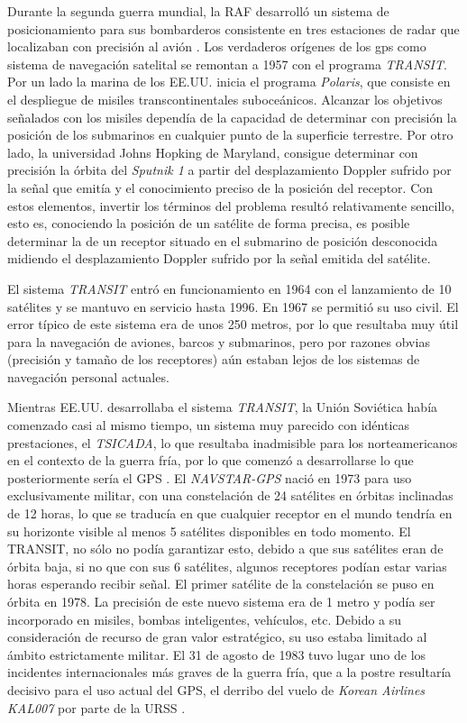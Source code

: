 Durante la segunda guerra mundial, la \ac{RAF} desarrolló un sistema de
posicionamiento para sus bombarderos consistente en tres estaciones de radar que localizaban
con precisión al avión \cite{Ori13}. 
Los verdaderos orígenes de los gps como sistema de navegación satelital se remontan a 1957 con
el programa \textit{TRANSIT}. Por un lado la marina de los \ac{EE.UU.} inicia el programa \textit{Polaris},
que consiste en el despliegue de misiles transcontinentales suboceánicos. Alcanzar los objetivos señalados
con los misiles dependía de la capacidad de determinar con precisión la posición de los
submarinos en cualquier punto de la superficie terrestre. Por otro lado, la universidad Johns
Hopking de Maryland, consigue determinar con precisión la órbita del \textit{Sputnik 1} a partir del
desplazamiento Doppler sufrido por la señal que emitía y el conocimiento preciso de la posición
del receptor. Con estos elementos, invertir los términos del problema resultó relativamente
sencillo, esto es, conociendo la posición de un satélite de forma precisa, es posible determinar
la de un receptor situado en el submarino de posición desconocida midiendo el desplazamiento
Doppler sufrido por la señal emitida del satélite.

El sistema \textit{TRANSIT} entró en funcionamiento en 1964 con el lanzamiento de 10 satélites y se mantuvo en servicio
hasta 1996. En 1967 se permitió su uso civil. El error típico de este sistema era de unos 250
metros, por lo que resultaba muy útil para la navegación de aviones, barcos y submarinos, pero
por razones obvias (precisión y tamaño de los receptores) aún estaban lejos de los sistemas de
navegación personal actuales.

Mientras \ac{EE.UU.} desarrollaba el sistema \textit{TRANSIT}, la Unión Soviética había comenzado casi al mismo tiempo, un sistema muy parecido con idénticas prestaciones, el \textit{TSICADA}, lo que resultaba inadmisible para los norteamericanos en el
contexto de la guerra fría, por lo que comenzó a desarrollarse lo que posteriormente sería el
\ac{GPS} \cite{Pala10}.
El \textit{NAVSTAR-GPS} nació en 1973 para uso exclusivamente militar, con una constelación de 24
satélites en órbitas inclinadas de 12 horas, lo que se traducía en que cualquier receptor en el
mundo tendría en su horizonte visible al menos 5 satélites disponibles en todo momento. El
TRANSIT, no sólo no podía garantizar esto, debido a que sus satélites eran de órbita baja, si no
que con sus 6 satélites, algunos receptores podían estar varias horas esperando recibir señal. El primer
satélite de la constelación se puso en órbita en 1978. La precisión de este nuevo sistema era de 1 metro y podía
ser incorporado en misiles, bombas inteligentes, vehículos, etc. Debido a su consideración de
recurso de gran valor estratégico, su uso estaba limitado al ámbito estrictamente militar.
 El 31 de agosto de 1983 tuvo lugar uno de los incidentes internacionales más graves de la
guerra fría, que a la postre resultaría decisivo para el uso actual del \ac{GPS}, el derribo del vuelo de
\textit{Korean Airlines KAL007} por parte de la \ac{URSS} \cite{Kore15}.

